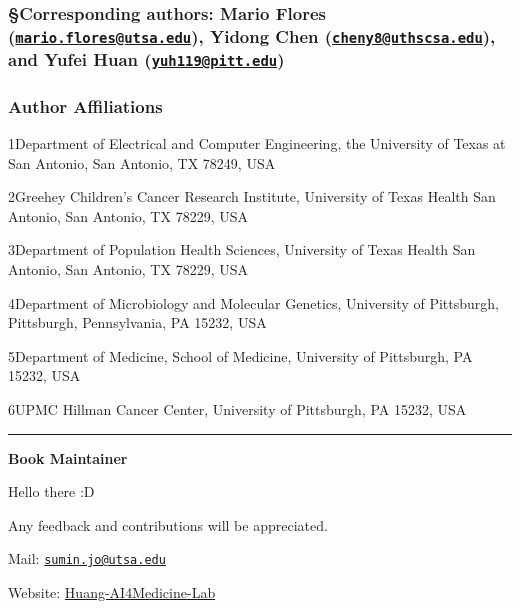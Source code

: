 \documentclass[
]{book}
\begin{document}
\hypertarget{corresponding-authors-mario-flores-mario.floresutsa.edu-yidong-chen-cheny8uthscsa.edu-and-yufei-huan-yuh119pitt.edu}{%
\subsubsection*{\texorpdfstring{\textbf{§Corresponding authors}: Mario Flores (\href{mailto:mario.flores@utsa.edu}{\nolinkurl{mario.flores@utsa.edu}}), Yidong Chen (\href{mailto:cheny8@uthscsa.edu}{\nolinkurl{cheny8@uthscsa.edu}}), and Yufei Huan (\href{mailto:yuh119@pitt.edu}{\nolinkurl{yuh119@pitt.edu}})}{§Corresponding authors: Mario Flores (mario.flores@utsa.edu), Yidong Chen (cheny8@uthscsa.edu), and Yufei Huan (yuh119@pitt.edu)}}\label{corresponding-authors-mario-flores-mario.floresutsa.edu-yidong-chen-cheny8uthscsa.edu-and-yufei-huan-yuh119pitt.edu}}

\hypertarget{author-affiliations}{%
\subsubsection*{\texorpdfstring{\textbf{Author Affiliations}}{Author Affiliations}}\label{author-affiliations}}

1Department of Electrical and Computer Engineering, the University of Texas at San Antonio, San Antonio, TX 78249, USA

2Greehey Children's Cancer Research Institute, University of Texas Health San Antonio, San Antonio, TX 78229, USA

3Department of Population Health Sciences, University of Texas Health San Antonio, San Antonio, TX 78229, USA

4Department of Microbiology and Molecular Genetics, University of Pittsburgh, Pittsburgh, Pennsylvania, PA 15232, USA

5Department of Medicine, School of Medicine, University of Pittsburgh, PA 15232, USA

6UPMC Hillman Cancer Center, University of Pittsburgh, PA 15232, USA

\begin{center}\rule{0.5\linewidth}{0.5pt}\end{center}

\textbf{Book Maintainer}

Hello there :D

Any feedback and contributions will be appreciated.

Mail: \href{mailto:sumin.jo@utsa.edu}{\nolinkurl{sumin.jo@utsa.edu}}

Website: \href{https://github.com/Huang-AI4Medicine-Lab}{Huang-AI4Medicine-Lab}

  
\end{document}
